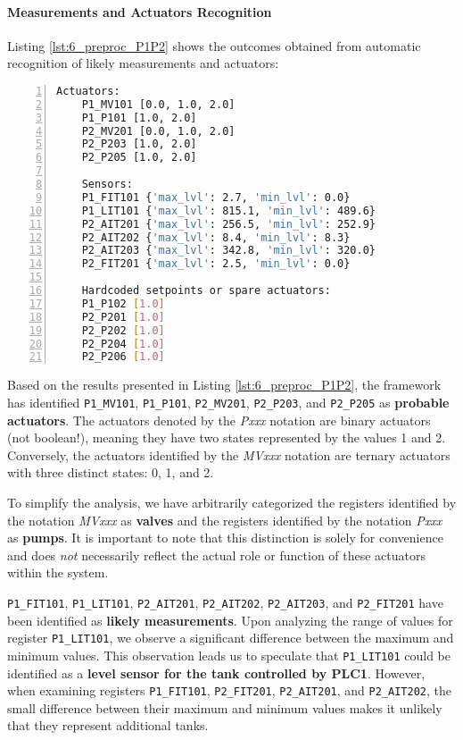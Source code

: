 \paragraph{Measurements and Actuators Recognition} 
\label{par:6_P1P2_measures_actuators_recognition}
Listing \ref{lst:6_preproc_P1P2} shows the outcomes obtained from automatic recognition of likely measurements and actuators:

\begin{lstlisting}[language=bash, numbers=left, caption=Preliminary analysis outcomes for sensors and actuators of \texttt{PLC1-2}, label=lst:6_preproc_P1P2]
	Actuators: 
	P1_MV101 [0.0, 1.0, 2.0]
	P1_P101 [1.0, 2.0]
	P2_MV201 [0.0, 1.0, 2.0]
	P2_P203 [1.0, 2.0]
	P2_P205 [1.0, 2.0]
	
	Sensors: 
	P1_FIT101 {'max_lvl': 2.7, 'min_lvl': 0.0}
	P1_LIT101 {'max_lvl': 815.1, 'min_lvl': 489.6}
	P2_AIT201 {'max_lvl': 256.5, 'min_lvl': 252.9}
	P2_AIT202 {'max_lvl': 8.4, 'min_lvl': 8.3}
	P2_AIT203 {'max_lvl': 342.8, 'min_lvl': 320.0}
	P2_FIT201 {'max_lvl': 2.5, 'min_lvl': 0.0}
	
	Hardcoded setpoints or spare actuators: 
	P1_P102 [1.0]
	P2_P201 [1.0]
	P2_P202 [1.0]
	P2_P204 [1.0]
	P2_P206 [1.0]
\end{lstlisting}

Based on the results presented in Listing \ref{lst:6_preproc_P1P2}, the framework has identified \texttt{P1\_MV101}, \texttt{P1\_P101}, \texttt{P2\_MV201}, \texttt{P2\_P203}, and \texttt{P2\_P205} as \textbf{probable actuators}. The actuators denoted by the \textit{Pxxx} notation are binary actuators (not boolean!), meaning they have two states represented by the values 1 and 2. Conversely, the actuators identified by the \textit{MVxxx} notation are ternary actuators with three distinct states: 0, 1, and 2. 

To simplify the analysis, we have arbitrarily categorized the registers identified by the notation \textit{MVxxx} as \textbf{valves} and the registers identified by the notation \textit{Pxxx} as \textbf{pumps}. It is important to note that this distinction is solely for convenience and does \textit{not} necessarily reflect the actual role or function of these actuators within the system. 

\bigskip
\texttt{P1\_FIT101}, \texttt{P1\_LIT101}, \texttt{P2\_AIT201}, \texttt{P2\_AIT202}, \texttt{P2\_AIT203}, and \texttt{P2\_FIT201} have been identified as \textbf{likely measurements}. Upon analyzing the range of values for register \texttt{P1\_LIT101}, we observe a significant difference between the maximum and minimum values. This observation leads us to speculate that \texttt{P1\_LIT101} could be identified as a \textbf{level sensor for the tank controlled by PLC1}. However, when examining registers \texttt{P1\_FIT101}, \texttt{P2\_FIT201}, \texttt{P2\_AIT201}, and \texttt{P2\_AIT202}, the small difference between their maximum and minimum values makes it unlikely that they represent additional tanks. 

